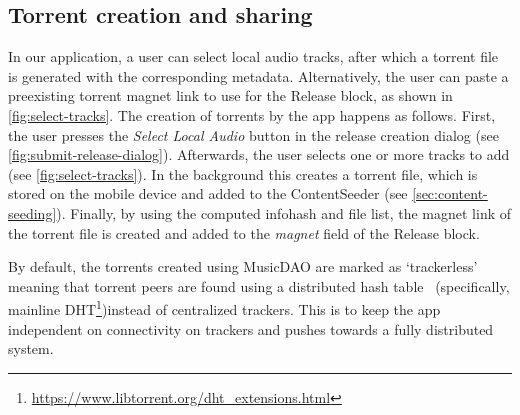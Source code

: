 \subsection{Torrent creation and sharing}
\label{sec:torrent-creation}
In our application, a user can select local audio tracks, after which a torrent file is generated with the corresponding metadata. Alternatively, the user can paste a preexisting torrent magnet link to use for the Release block, as shown in \ref{fig:select-tracks}. The creation of torrents by the app happens as follows. First, the user presses the \textit{Select Local Audio} button in the release creation dialog (see \ref{fig:submit-release-dialog}). Afterwards, the user selects one or more tracks to add (see \ref{fig:select-tracks}). In the background this creates a torrent file, which is stored on the mobile device and added to the ContentSeeder (see \ref{sec:content-seeding}). Finally, by using the computed infohash and file list, the magnet link of the torrent file is created and added to the \textit{magnet} field of the Release block.

By default, the torrents created using MusicDAO are marked as `trackerless' meaning that torrent peers are found using a distributed hash table~\citep{dht2019} (specifically, mainline DHT\footnote{\url{https://www.libtorrent.org/dht_extensions.html}})instead of centralized trackers. This is to keep the app independent on connectivity on trackers and pushes towards a fully distributed system.

